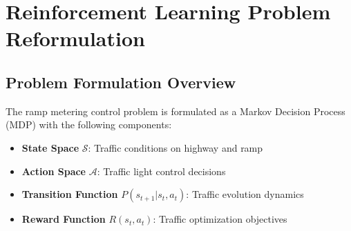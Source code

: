 \documentclass[a4paper, 12pt]{article}
\begin{document}
\section{Reinforcement Learning Problem Reformulation}

\subsection{Problem Formulation Overview}
\begin{tcolorbox}[title=MDP Formulation]
The ramp metering control problem is formulated as a Markov Decision Process (MDP) with the following components:
\begin{itemize}
    \item \textbf{State Space} \( \mathcal{S} \): Traffic conditions on highway and ramp
    \item \textbf{Action Space} \( \mathcal{A} \): Traffic light control decisions
    \item \textbf{Transition Function} \( P(s_{t+1}|s_t,a_t) \): Traffic evolution dynamics
    \item \textbf{Reward Function} \( R(s_t,a_t) \): Traffic optimization objectives
\end{itemize}
\end{tcolorbox}
\end{document}
